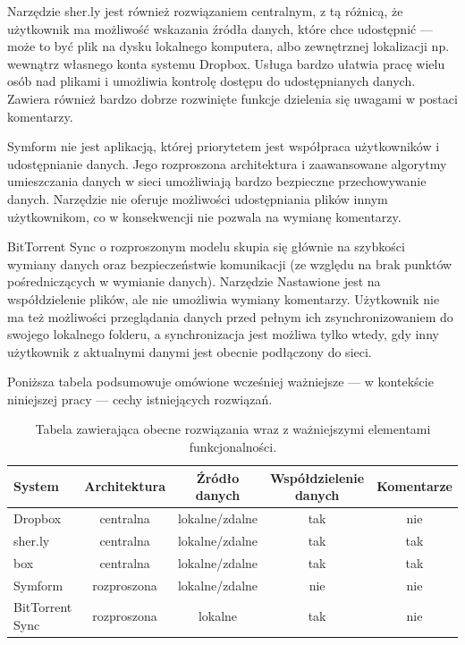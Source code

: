 \documentclass[polish,a4paper,twoside]{ppfcmthesis}
\begin{document}
Narzędzie sher.ly jest również rozwiązaniem centralnym, z tą różnicą, że użytkownik ma możliwość wskazania źródła danych, które chce udostępnić --- może to być plik na dysku lokalnego komputera, albo zewnętrznej lokalizacji np. wewnątrz własnego konta systemu Dropbox. Usługa bardzo ułatwia pracę wielu osób nad plikami i umożliwia kontrolę dostępu do udostępnianych danych. Zawiera również bardzo dobrze rozwinięte funkcje dzielenia się uwagami w postaci komentarzy.

Symform nie jest aplikacją, której priorytetem jest współpraca użytkowników i udostępnianie danych. Jego rozproszona architektura i zaawansowane algorytmy umieszczania danych w sieci umożliwiają bardzo bezpieczne przechowywanie danych. Narzędzie nie oferuje możliwości udostępniania plików innym użytkownikom, co w konsekwencji nie pozwala na wymianę komentarzy.

BitTorrent Sync o rozproszonym modelu skupia się głównie na szybkości wymiany danych oraz bezpieczeństwie komunikacji (ze względu na brak punktów pośredniczących w wymianie danych). Narzędzie Nastawione jest na współdzielenie plików, ale nie umożliwia wymiany komentarzy. Użytkownik nie ma też możliwości przeglądania danych przed pełnym ich zsynchronizowaniem do swojego lokalnego folderu, a synchronizacja jest możliwa tylko wtedy, gdy inny użytkownik z aktualnymi danymi jest obecnie podłączony do sieci.

Poniższa tabela podsumowuje omówione wcześniej ważniejsze --- w kontekście niniejszej pracy --- cechy istniejących rozwiązań.

\begin{table}[h!]
 \centering
 \label{nazwa odnośnika, która potem użyjemy do cytowania tabeli}
 \begin{tabular}{| l | c | c | c | c |}
  \hline
  \textbf{System} & \textbf{Architektura} & \textbf{Źródło danych} & \textbf{Współdzielenie danych} & \textbf{Komentarze} \\
  \hline
  Dropbox & centralna & lokalne/zdalne & tak & nie \\
  sher.ly & centralna & lokalne/zdalne & tak & tak \\
  box & centralna & lokalne/zdalne & tak & tak \\
  Symform & rozproszona & lokalne/zdalne & nie & nie \\
  BitTorrent Sync & rozproszona & lokalne & tak & nie \\
  \hline
 \end{tabular}
 \caption{Tabela zawierająca obecne rozwiązania wraz z ważniejszymi elementami funkcjonalności.}
\end{table}
\end{document}
